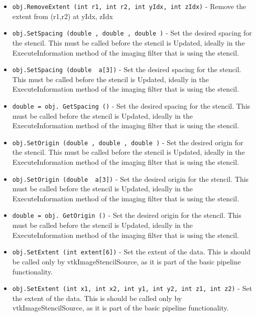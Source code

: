 \begin{itemize}
\item  \verb|obj.RemoveExtent (int r1, int r2, int yIdx, int zIdx)| -  Remove the extent from (r1,r2) at yIdx, zIdx

\item  \verb|obj.SetSpacing (double , double , double )| -  Set the desired spacing for the stencil.
 This must be called before the stencil is Updated, ideally 
 in the ExecuteInformation method of the imaging filter that
 is using the stencil.

\item  \verb|obj.SetSpacing (double  a[3])| -  Set the desired spacing for the stencil.
 This must be called before the stencil is Updated, ideally 
 in the ExecuteInformation method of the imaging filter that
 is using the stencil.

\item  \verb|double = obj. GetSpacing ()| -  Set the desired spacing for the stencil.
 This must be called before the stencil is Updated, ideally 
 in the ExecuteInformation method of the imaging filter that
 is using the stencil.

\item  \verb|obj.SetOrigin (double , double , double )| -  Set the desired origin for the stencil.
 This must be called before the stencil is Updated, ideally 
 in the ExecuteInformation method of the imaging filter that
 is using the stencil.

\item  \verb|obj.SetOrigin (double  a[3])| -  Set the desired origin for the stencil.
 This must be called before the stencil is Updated, ideally 
 in the ExecuteInformation method of the imaging filter that
 is using the stencil.

\item  \verb|double = obj. GetOrigin ()| -  Set the desired origin for the stencil.
 This must be called before the stencil is Updated, ideally 
 in the ExecuteInformation method of the imaging filter that
 is using the stencil.

\item  \verb|obj.SetExtent (int extent[6])| -  Set the extent of the data.  This is should be called only 
 by vtkImageStencilSource, as it is part of the basic pipeline
 functionality.

\item  \verb|obj.SetExtent (int x1, int x2, int y1, int y2, int z1, int z2)| -  Set the extent of the data.  This is should be called only 
 by vtkImageStencilSource, as it is part of the basic pipeline
 functionality.


\end{itemize}
